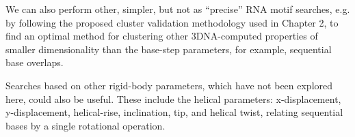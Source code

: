 We can also  perform other, simpler, but not  as ``precise'' RNA motif
searches,   e.g.   by  following   the  proposed   cluster  validation
methodology  used  in  Chapter  2,  to  find  an  optimal  method  for
clustering  other 3DNA-computed  properties of  smaller dimensionality
than the base-step parameters, for example, sequential base overlaps.

Searches  based on other  rigid-body parameters,  which have  not been
explored  here,  could  also  be  useful. These  include  the  helical
parameters: x-displacement, y-displacement, helical-rise, inclination,
tip,  and  helical  twist,  relating  sequential  bases  by  a  single
rotational operation.




